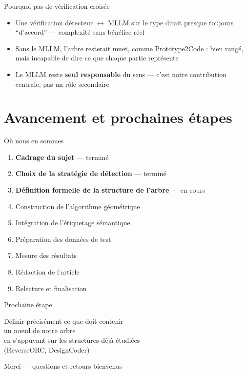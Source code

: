 \documentclass[11pt,aspectratio=169]{beamer}
\begin{document}
\begin{frame}{Pourquoi pas de vérification croisée}
  \begin{itemize}
    \item Une vérification détecteur $\leftrightarrow$ MLLM sur le type dirait presque toujours ``d'accord'' --- complexité sans bénéfice réel
    \item Sans le MLLM, l'arbre resterait muet, comme Prototype2Code : bien rangé, mais incapable de dire ce que chaque partie représente
    \item Le MLLM reste \textbf{seul responsable} du sens --- c'est notre contribution centrale, pas un rôle secondaire
  \end{itemize}
\end{frame}

\section{Avancement et prochaines étapes}

\begin{frame}{Où nous en sommes}
  \begin{enumerate}
    \item \textcolor{mathblue}{\textbf{Cadrage du sujet}} --- terminé \checkmark
    \item \textcolor{mathblue}{\textbf{Choix de la stratégie de détection}} --- terminé \checkmark
    \item \alert{\textbf{Définition formelle de la structure de l'arbre}} --- en cours
    \item Construction de l'algorithme géométrique
    \item Intégration de l'étiquetage sémantique
    \item Préparation des données de test
    \item Mesure des résultats
    \item Rédaction de l'article
    \item Relecture et finalisation
  \end{enumerate}
\end{frame}

\begin{frame}{Prochaine étape}
  \begin{center}
  \Large Définir précisément ce que doit contenir\\ un \alert{nœud} de notre arbre
  \\[6mm]
  \small en s'appuyant sur les structures déjà étudiées \\ (ReverseORC, DesignCoder)
  \end{center}
\end{frame}

\begin{frame}[standout]
  Merci --- questions et retours bienvenus
\end{frame}
\end{document}
